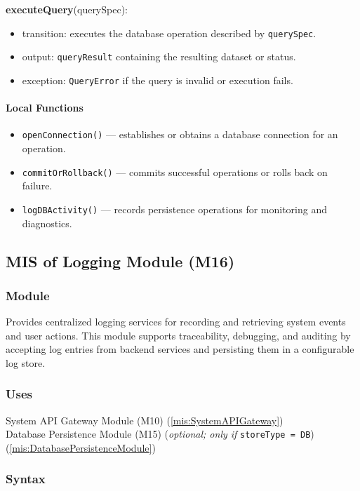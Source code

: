 \documentclass[12pt, titlepage]{article}
\begin{document}
\begin{itemize}
  \noindent \textbf{executeQuery}(querySpec):
  \begin{itemize}
    \item transition: executes the database operation described by \texttt{querySpec}.
    \item output: \texttt{queryResult} containing the resulting dataset or status.
    \item exception: \texttt{QueryError} if the query is invalid or execution fails.
  \end{itemize}

  \paragraph{Local Functions}
  \begin{itemize}
    \item \texttt{openConnection()} — establishes or obtains a database connection for an operation.
    \item \texttt{commitOrRollback()} — commits successful operations or rolls back on failure.
    \item \texttt{logDBActivity()} — records persistence operations for monitoring and diagnostics.
  \end{itemize}


\subsection{MIS of Logging Module (M16)}
  \label{mis:LoggingModule}

  \subsubsection{Module}
  Provides centralized logging services for recording and retrieving system events and user actions.
  This module supports traceability, debugging, and auditing by accepting log entries from backend services
  and persisting them in a configurable log store.

  \subsubsection{Uses}
  System API Gateway Module (M10)  (\ref{mis:SystemAPIGateway})\\
  Database Persistence Module (M15) (\emph{optional; only if} \texttt{storeType = DB}) (\ref{mis:DatabasePersistenceModule})\\

  \subsubsection{Syntax}


\end{itemize}
\end{document}
